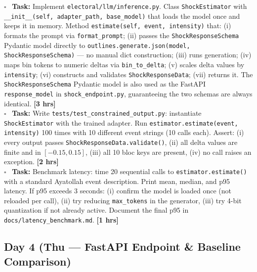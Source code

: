 \documentclass[11pt]{article}
\newcommand{\hrs}[1]{\textbf{[#1 hrs]}}
\newcommand{\dayhead}[2]{%
  \subsection*{Day #1 \normalfont\small\color{codegray}(#2)}}
\newcommand{\task}[2]{%
  \noindent\textbf{Task:} #1 \hfill \hrs{#2}\\}
\newcommand{\done}{\textcolor{sectionblue}{$\square$}\ }
\begin{document}
\begin{taskbox}
\done \task{Implement \texttt{electoral/llm/inference.py}. Class
  \texttt{ShockEstimator} with \texttt{\_\_init\_\_(self, adapter\_path,
  base\_model)} that loads the model once and keeps it in memory.
  Method \texttt{estimate(self, event, intensity)} that: (i) formats
  the prompt via \texttt{format\_prompt}; (ii) passes the
  \texttt{ShockResponseSchema} Pydantic model directly to
  \texttt{outlines.generate.json(model, ShockResponseSchema)} ---
  no manual dict construction; (iii) runs generation;
  (iv) maps bin tokens to numeric deltas via \texttt{bin\_to\_delta};
  (v) scales delta values by \texttt{intensity}; (vi) constructs and
  validates \texttt{ShockResponseData}; (vii) returns it. The
  \texttt{ShockResponseSchema} Pydantic model is also used as the
  FastAPI \texttt{response\_model} in \texttt{shock\_endpoint.py},
  guaranteeing the two schemas are always identical.}{3}

\done \task{Write \texttt{tests/test\_constrained\_output.py}: instantiate
  \texttt{ShockEstimator} with the trained adapter. Run
  \texttt{estimator.estimate(event, intensity)} 100 times with 10 different
  event strings (10 calls each). Assert: (i) every output passes
  \texttt{ShockResponseData.validate()}, (ii) all delta values are finite and
  in $[-0.15, 0.15]$, (iii) all 10 bloc keys are present, (iv) no call
  raises an exception.}{2}

\done \task{Benchmark latency: time 20 sequential calls to
  \texttt{estimator.estimate()} with a standard Ayatollah event description.
  Print mean, median, and p95 latency. If p95 exceeds 3 seconds: (i) confirm
  the model is loaded once (not reloaded per call), (ii) try reducing
  \texttt{max\_tokens} in the generator, (iii) try 4-bit quantization if
  not already active. Document the final p95 in
  \texttt{docs/latency\_benchmark.md}.}{1}
\end{taskbox}

\dayhead{4}{Thu --- FastAPI Endpoint \& Baseline Comparison}
\end{document}
